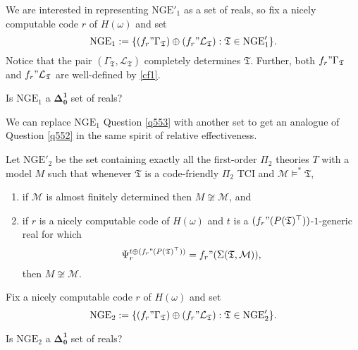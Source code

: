 \documentclass[12pt]{article}
\numberwithin{equation}{section}
\begin{document}
We are interested in representing $\mathrm{NGE}'_1$ as a set of reals, so fix a nicely computable code $r$ of $H(\omega)$ and set
\begin{equation*}
    \mathrm{NGE}_1 := \{(f_r" \Gamma_{\mathfrak{T}}) \oplus (f_r" \mathcal{L}_{\mathfrak{T}}) : \mathfrak{T} \in \mathrm{NGE}'_1\} \text{.}
\end{equation*}
Notice that the pair $(\Gamma_{\mathfrak{T}}, \mathcal{L}_{\mathfrak{T}})$ completely determines $\mathfrak{T}$. Further, both $f_r" \Gamma_{\mathfrak{T}}$ and $f_r" \mathcal{L}_{\mathfrak{T}}$ are well-defined by \ref{cf1}.

\begin{ques}\label{q553}
Is $\mathrm{NGE}_1$ a $\mathbf{\Delta^1_0}$ set of reals?
\end{ques}

We can replace $\mathrm{NGE}_1$ Question \ref{q553} with another set to get an analogue of Question \ref{q552} in the same spirit of relative effectiveness. 

\begin{defi}
Let $\mathrm{NGE}'_2$ be the set containing exactly all the first-order $\Pi_2$ theories $T$ with a model $M$ such that whenever $\mathfrak{T}$ is a code-friendly $\Pi_2$ TCI and $\mathcal{M} \models^* \mathfrak{T}$,
\begin{enumerate}[label=(\alph*)]
    \item if $\mathcal{M}$ is almost finitely determined then $M \not \cong \mathcal{M}$, and
    \item if $r$ is a nicely computable code of $H(\omega)$ and $t$ is a $(f_r" (P(\mathfrak{T})^{\top}))$-$1$-generic real for which
    \begin{equation*}
        \Psi_r^{t \oplus (f_r" (P(\mathfrak{T})^{\top}))} = f_r" (\Sigma(\mathfrak{T}, \mathcal{M})) \text{,}
    \end{equation*}
    then $M \not \cong \mathcal{M}$.
\end{enumerate}
\end{defi}

Fix a nicely computable code $r$ of $H(\omega)$ and set
\begin{equation*}
    \mathrm{NGE}_2 := \{(f_r" \Gamma_{\mathfrak{T}}) \oplus (f_r" \mathcal{L}_{\mathfrak{T}}) : \mathfrak{T} \in \mathrm{NGE}'_2\} \text{.}
\end{equation*}

\begin{ques}
Is $\mathrm{NGE}_2$ a $\mathbf{\Delta^1_0}$ set of reals?
\end{ques}
\end{document}
